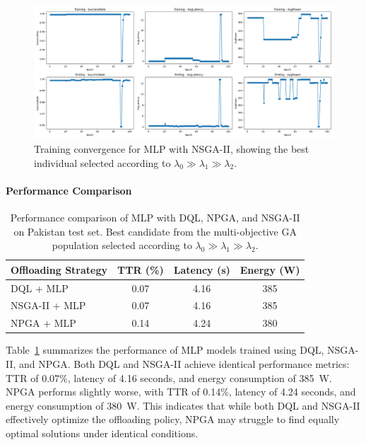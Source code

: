 \documentclass[preprint,3p,authoryear]{elsarticle}
\begin{document}
\begin{figure}[H]
    \centering
    \includegraphics[width=0.95\linewidth]{figs/nsga2_mlp_training_epoch.png}
    \caption{Training convergence for MLP with NSGA-II, showing the best individual selected according to \(\lambda_0 \gg \lambda_1 \gg \lambda_2\).}  
    \label{fig:nsga2-mlp-training-epoch}  
\end{figure}

\paragraph{Performance Comparison}

\begin{table}[H]
\centering
\begin{tabular}{lccc}
\toprule
\textbf{Offloading Strategy} & \textbf{TTR (\%)} & \textbf{Latency (s)} & \textbf{Energy (W)} \\
\midrule
DQL + MLP & 0.07 & 4.16 & 385 \\
\hline
NSGA-II + MLP & 0.07 & 4.16 & 385 \\
NPGA + MLP & 0.14 & 4.24 & 380 \\
\bottomrule
\end{tabular}
\caption{Performance comparison of MLP with DQL, NPGA, and NSGA-II on Pakistan test set. Best candidate from the multi-objective GA population selected according to \(\lambda_0 \gg \lambda_1 \gg \lambda_2\).}
\label{tab:mlp_comparison}
\end{table}

Table~\ref{tab:mlp_comparison} summarizes the performance of MLP models trained using DQL, NSGA-II, and NPGA. Both DQL and NSGA-II achieve identical performance metrics: TTR of 0.07\%, latency of 4.16 seconds, and energy consumption of 385~W. NPGA performs slightly worse, with TTR of 0.14\%, latency of 4.24 seconds, and energy consumption of 380~W. This indicates that while both DQL and NSGA-II effectively optimize the offloading policy, NPGA may struggle to find equally optimal solutions under identical conditions.
\end{document}
